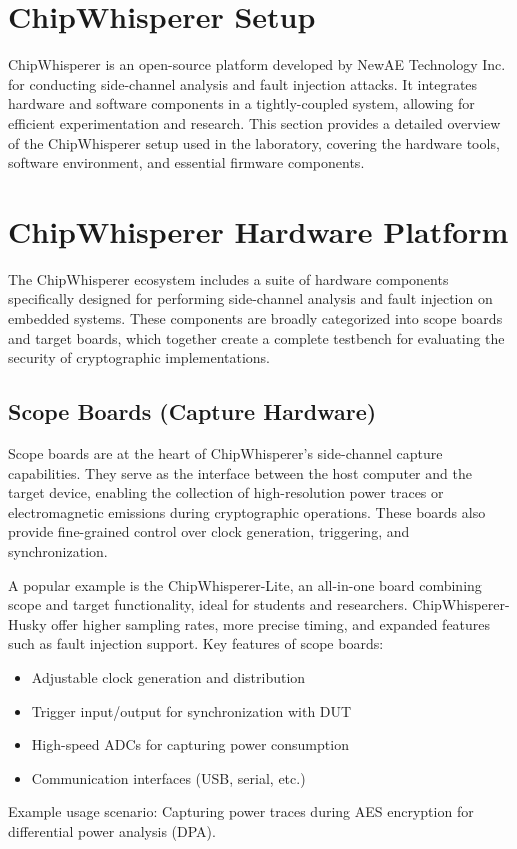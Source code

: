 \section{ChipWhisperer Setup}
ChipWhisperer is an open-source platform developed by NewAE Technology Inc. for conducting side-channel analysis and fault injection attacks. It integrates hardware and software components in a tightly-coupled system, allowing for efficient experimentation and research. This section provides a detailed overview of the ChipWhisperer setup used in the laboratory, covering the hardware tools, software environment, and essential firmware components.
\section{ChipWhisperer Hardware Platform}
The ChipWhisperer ecosystem includes a suite of hardware components specifically designed for performing side-channel analysis and fault injection on embedded systems. These components are broadly categorized into scope boards and target boards, which together create a complete testbench for evaluating the security of cryptographic implementations.
\subsection{Scope Boards (Capture Hardware)}
Scope boards are at the heart of ChipWhisperer's side-channel capture capabilities. They serve as the interface between the host computer and the target device, enabling the collection of high-resolution power traces or electromagnetic emissions during cryptographic operations. These boards also provide fine-grained control over clock generation, triggering, and synchronization.

A popular example is the ChipWhisperer-Lite, an all-in-one board combining scope and target functionality, ideal for students and researchers. ChipWhisperer-Husky offer higher sampling rates, more precise timing, and expanded features such as fault injection support.
Key features of scope boards:
\begin{itemize}
    \item Adjustable clock generation and distribution
    \item Trigger input/output for synchronization with DUT
    \item High-speed ADCs for capturing power consumption
    \item Communication interfaces (USB, serial, etc.)
\end{itemize}
Example usage scenario: Capturing power traces during AES encryption for differential power analysis (DPA).
